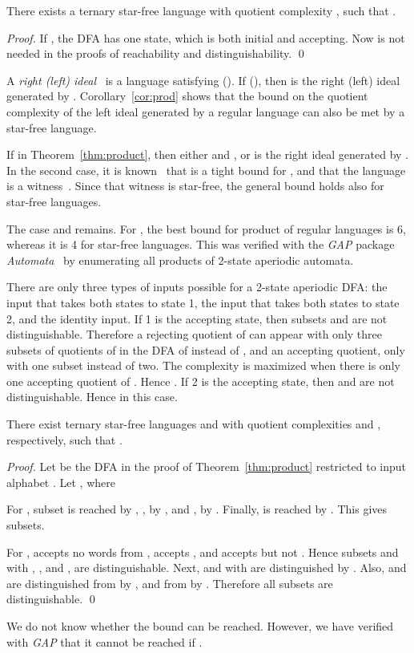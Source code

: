 \documentclass{llncs}
\begin{document}
\begin{corollary}
\label{cor:prod}
There exists a ternary star-free language  with quotient complexity  , such that  .
\end{corollary}
\begin{proof}
If ,  the DFA  has one  state, which is both initial and accepting.
Now   is not needed in the proofs of reachability and
distinguishability.
\qed
\end{proof}

A \emph{right (left) ideal}~\cite{BJL10} is a language  satisfying  (). 
If  (), then  is the right (left) ideal generated by .
Corollary~\ref{cor:prod} shows that  the bound  on the quotient complexity of the left ideal generated by a regular language can also be met by a star-free language.

If  in Theorem~\ref{thm:product}, then either  and , or  is the right ideal generated by . In the second case, it is known~\cite{YZS94} that  is a tight bound for , and that the language  is a witness~\cite{BJL10}. Since that witness is star-free, the general bound holds also for star-free languages.

The case  and  remains. 
For , the best bound for product of  regular languages is 6, whereas it is 4 for star-free languages. This was verified with the \emph{GAP} package \emph{Automata}~\cite{GAP} by enumerating all products of 2-state aperiodic automata.

There are only three types of inputs possible for a 2-state aperiodic DFA:
the input that takes both states to state 1, the input that takes both states to state 2, and the identity input.
If 1 is the accepting state, then subsets  and  are not distinguishable.
Therefore a rejecting quotient  of  can appear with only three subsets of quotients of  in the DFA of  instead of ,  and an accepting quotient, only with one subset instead of two.
The complexity is maximized when there is only one accepting quotient of . Hence . 
If 2 is the accepting state, then   and  are not distinguishable.
Hence  in this case.

\begin{theorem}
\label{thm:m2}
There exist ternary star-free languages  and  with quotient complexities  and , respectively, such that .
\end{theorem}
\begin{proof}
Let  be the DFA in the proof of Theorem~\ref{thm:product} restricted to input alphabet .
Let , where

For , subset   is reached by ,  
, by , 
and , by . 
Finally,  is reached by .
This gives  subsets.

For ,    accepts no words from ,  accepts , and  accepts  but not . 
Hence subsets  and  with ,
, and , are distinguishable. 
Next,  and  with  are distinguished by .
Also,  and  are distinguished from 
by , and  from  by . Therefore all  subsets are distinguishable.
\qed
\end{proof}
We do not know whether the bound  can be reached. However, we have verified with \emph{GAP} that it cannot be reached if .
\end{document}
